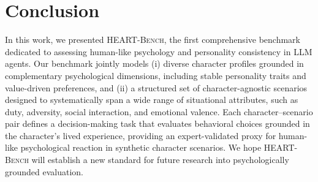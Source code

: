 \documentclass{article}
\newcommand{\ourbench}[0]{\textsc{HEART-Bench}\xspace}
\begin{document}
\section{Conclusion}
In this work, we presented \ourbench, the first comprehensive benchmark dedicated to assessing human-like psychology and personality consistency in LLM agents. Our benchmark jointly models (i) diverse character profiles grounded in complementary psychological dimensions, including stable personality traits and value-driven preferences, and (ii) a structured set of character-agnostic scenarios designed to systematically span a wide range of situational attributes, such as duty, adversity, social interaction, and emotional valence. Each character–scenario pair defines a decision-making task that evaluates behavioral choices grounded in the character's lived experience, providing an expert-validated proxy for human-like psychological reaction in synthetic character scenarios. We hope \ourbench will establish a new standard for future research into psychologically grounded evaluation.



\newpage
% 
\appendix

\end{document}
